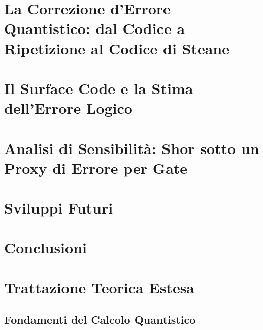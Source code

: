 \documentclass[oneside, 12pt]{report}
\begin{document}
\chapter{La Correzione d'Errore Quantistico: dal Codice a Ripetizione al Codice di Steane}
\label{chap:qec}
\label{chap:predizione}   %


\chapter{Il Surface Code e la Stima dell'Errore Logico}
\label{chap:surface}


\chapter{Analisi di Sensibilità: Shor sotto un Proxy di Errore per Gate}
\label{chap:integrazione}


\chapter{Sviluppi Futuri}
\label{chap:sviluppi}


\chapter{Conclusioni}
\label{chap:conclusioni}


\appendix

\chapter{Trattazione Teorica Estesa}
\label{app:teoria}
\section{Fondamenti del Calcolo Quantistico}
\label{app:fondamenti}

\end{document}
